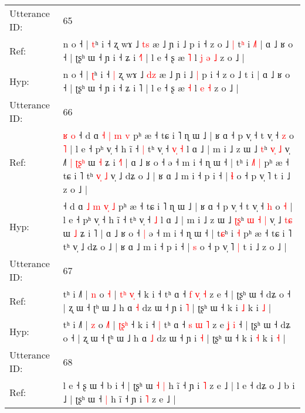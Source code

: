 \documentclass[10pt]{article}
\DeclareRobustCommand{\hl}[1]{{\textcolor{red}{#1}}}
\begin{document}
\begin{longtable}{ll}
\midrule
Utterance ID: & 65 \\
Ref: & n o ˧ | \hl{t}ʰ i ˧\hl{}\hl{} ʐ wɤ ˩ \hl{t}\hl{s} æ ˩ ɲ i ˩\hl{}\hl{} p i ˧ z o ˩\hl{ }\hl{|} t\hl{ʰ} i\hl{ }\hl{˩}\hl{˥} | ɑ ˩ ʁ o ˧ | ʈʂʰ ɯ ˧ ɲ i ˧ ʑ i \hl{˧}˥ | l e ˧ ʂ æ \hl{˥} l\hl{ }\hl{j} \hl{ə} \hl{˩} z o ˩ |
 \\
Hyp: & n o ˧ | \hl{ʈ}ʰ i ˧\hl{ }\hl{|} ʐ wɤ ˩ \hl{d}\hl{z} æ ˩ ɲ i ˩\hl{ }\hl{|} p i ˧ z o ˩\hl{}\hl{} t\hl{} i\hl{}\hl{}\hl{} | ɑ ˩ ʁ o ˧ | ʈʂʰ ɯ ˧ ɲ i ˧ ʑ i \hl{}˥ | l e ˧ ʂ æ \hl{˧} l\hl{}\hl{} \hl{e} \hl{˧} z o ˩ |
 \\
\midrule
Utterance ID: & 66 \\
Ref: & \hl{ʁ}\hl{ }\hl{o}\hl{ }˧ d ɑ \hl{˧} \hl{|} \hl{}\hl{m} \hl{v} pʰ æ ˧ tɕ i ˥ ɳ ɯ ˩ | ʁ ɑ ˧ p v̩ ˧ t v̩ ˧ \hl{z} o \hl{˥} | l e ˧ pʰ v̩ ˧ h ĩ ˧\hl{ }\hl{|} tʰ v̩ ˧\hl{ }\hl{v}\hl{̩} \hl{˧} l ɑ ˩ | m i ˩ z ɯ ˩ \hl{}\hl{t}ʰ \hl{}\hl{v}\hl{̩} \hl{˩} v̩ ˩\hl{˥}\hl{ }\hl{|} \hl{ʈ}\hl{ʂ}\hl{ʰ} ɯ \hl{˧} ʑ i \hl{˧}˥ | ɑ ˩ ʁ o ˧\hl{}\hl{} ə ˧ m i ˧ ɳ ɯ ˧ | t\hl{}ʰ i\hl{ }\hl{˩}\hl{˥} \hl{|} pʰ æ ˧ tɕ i ˥ tʰ\hl{ }\hl{v}\hl{̩}\hl{ }\hl{˩} v̩ ˩ dʑ o ˩ | ʁ ɑ ˩ m i ˧ p i ˧ | \hl{ɬ} o ˧ p v̩ ˥\hl{}\hl{} t i ˩ z o ˩ |
 \\
Hyp: & \hl{}\hl{}\hl{}\hl{}˧ d ɑ \hl{˩} \hl{m} \hl{v}\hl{̩} \hl{˩} pʰ æ ˧ tɕ i ˥ ɳ ɯ ˩ | ʁ ɑ ˧ p v̩ ˧ t v̩ ˧ \hl{h} o \hl{˧} | l e ˧ pʰ v̩ ˧ h ĩ ˧\hl{}\hl{} tʰ v̩ ˧\hl{}\hl{}\hl{} \hl{˩} l ɑ ˩ | m i ˩ z ɯ ˩ \hl{ʈ}\hl{ʂ}ʰ \hl{ɯ}\hl{ }\hl{˧} \hl{|} v̩ ˩\hl{}\hl{}\hl{} \hl{}\hl{t}\hl{ɕ} ɯ \hl{˩} ʑ i \hl{}˥ | ɑ ˩ ʁ o ˧\hl{ }\hl{|} ə ˧ m i ˧ ɳ ɯ ˧ | t\hl{ɕ}ʰ i\hl{}\hl{}\hl{} \hl{˧} pʰ æ ˧ tɕ i ˥ tʰ\hl{}\hl{}\hl{}\hl{}\hl{} v̩ ˩ dʑ o ˩ | ʁ ɑ ˩ m i ˧ p i ˧ | \hl{s} o ˧ p v̩ ˥\hl{ }\hl{|} t i ˩ z o ˩ |
 \\
\midrule
Utterance ID: & 67 \\
Ref: & tʰ i ˩˥ | \hl{n} o \hl{}\hl{˧} | \hl{t}\hl{ʰ}\hl{ }\hl{v}\hl{̩} ˧ k i ˧\hl{}\hl{} tʰ ɑ ˧ \hl{f} \hl{v}\hl{̩} \hl{˧} z e\hl{}\hl{}\hl{}\hl{} ˧ | ʈʂʰ ɯ ˧ dʑ o ˧ | ʐ ɯ ˧ ʈʰ ɯ ˩ h ɑ \hl{˧} dz ɯ ˧ ɲ i \hl{˥} | ʈʂʰ ɯ ˧ k i \hl{˩} k i \hl{˩} |
 \\
Hyp: & tʰ i ˩˥ | \hl{z} o \hl{˩}\hl{˥} | \hl{}\hl{}\hl{ʈ}\hl{ʂ}\hl{ʰ} ˧ k i ˧\hl{ }\hl{|} tʰ ɑ ˧ \hl{s} \hl{}\hl{ɯ} \hl{˥} z e\hl{ }\hl{ʝ}\hl{ }\hl{i} ˧ | ʈʂʰ ɯ ˧ dʑ o ˧ | ʐ ɯ ˧ ʈʰ ɯ ˩ h ɑ \hl{˩} dz ɯ ˧ ɲ i \hl{˧} | ʈʂʰ ɯ ˧ k i \hl{˧} k i \hl{˧} |
 \\
\midrule
Utterance ID: & 68 \\
Ref: & l e ˧ ʂ ɯ ˧ b i ˧ | ʈʂʰ ɯ\hl{ }\hl{˧} \hl{|} h ĩ ˧ ɲ i \hl{˥} z e ˩ | l e ˧ dʑ o ˩ b i ˩ | ʈʂʰ ɯ ˧\hl{ }\hl{|} h ĩ ˧ ɲ i \hl{˥} z e ˩ |

\end{longtable}
\end{document}
